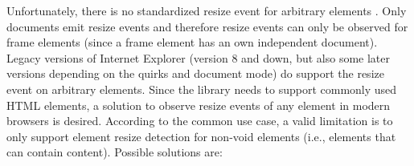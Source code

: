 \documentclass[a4paper,11pt]{kth-mag}
\begin{document}
        Unfortunately, there is no standardized resize event for arbitrary \glspl{element} \cite{w3c_dom2_events}.
        Only \glspl{document} emit resize events and therefore resize events can only be observed for frame elements (since a frame element has an own independent document).
        Legacy versions of Internet Explorer (version 8 and down, but also some later versions depending on the quirks and \gls{document} mode) do support the resize event on arbitrary \glspl{element}.
        Since the library needs to support commonly used \gls{HTML} \glspl{element}, a solution to observe resize events of any \gls{element} in modern browsers is desired.
        According to the common use case, a valid limitation is to only support element resize detection for non-void elements (i.e., elements that can contain content).
        Possible solutions are:
\end{document}
